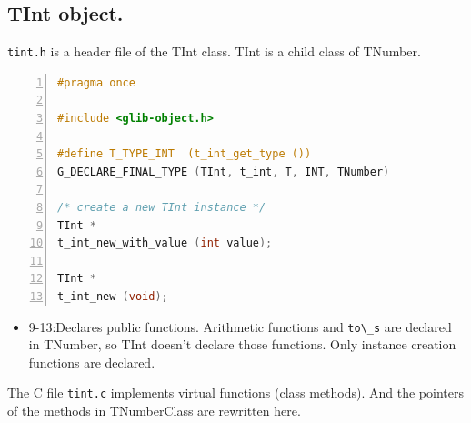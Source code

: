 \subsection{TInt object.}\label{tint-object.}

\passthrough{\lstinline!tint.h!} is a header file of the TInt class.
TInt is a child class of TNumber.

\begin{lstlisting}[language=C, numbers=left]
#pragma once

#include <glib-object.h>

#define T_TYPE_INT  (t_int_get_type ())
G_DECLARE_FINAL_TYPE (TInt, t_int, T, INT, TNumber)

/* create a new TInt instance */
TInt *
t_int_new_with_value (int value);

TInt *
t_int_new (void);
\end{lstlisting}

\begin{itemize}
\tightlist
\item
  9-13:Declares public functions. Arithmetic functions and
  \passthrough{\lstinline!to\_s!} are declared in TNumber, so TInt
  doesn't declare those functions. Only instance creation functions are
  declared.
\end{itemize}

The C file \passthrough{\lstinline!tint.c!} implements virtual functions
(class methods). And the pointers of the methods in TNumberClass are
rewritten here.

